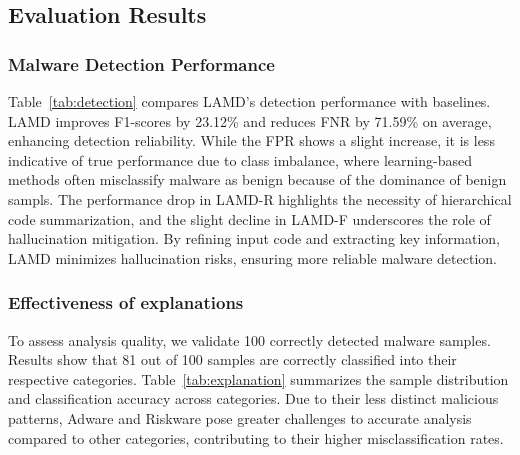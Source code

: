 \subsection{Evaluation Results}
\subsubsection{Malware Detection Performance}
Table~\ref{tab:detection} compares LAMD’s detection performance with baselines. LAMD improves F1-scores by 23.12\% and reduces FNR by 71.59\% on average, enhancing detection reliability. While the FPR shows a slight increase, it is less indicative of true performance due to class imbalance, where learning-based methods often misclassify malware as benign because of the dominance of 
benign sampls. The performance drop in LAMD-R highlights the necessity of hierarchical code summarization, and the slight decline in LAMD-F underscores the role of hallucination mitigation. By refining input code and extracting key information, LAMD minimizes hallucination risks, ensuring more reliable malware detection. 



\subsubsection{Effectiveness of explanations}
To assess analysis quality, we validate 100 correctly detected malware samples. 
Results show that 81 out of 100 samples are correctly classified into their respective categories. Table~\ref{tab:explanation} summarizes the sample distribution and classification accuracy across categories. Due to their less distinct malicious patterns, Adware and Riskware pose greater challenges to accurate analysis compared to other categories, contributing to their higher misclassification rates.


